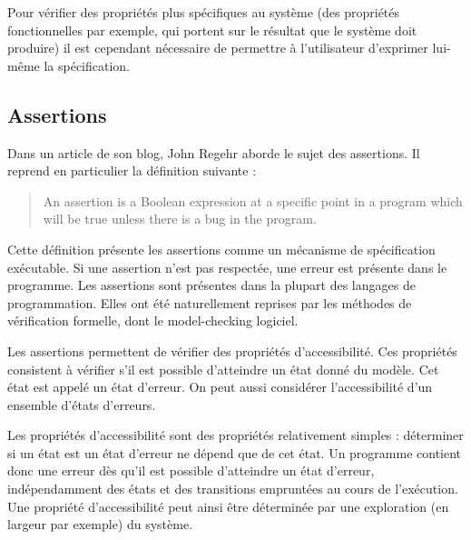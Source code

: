 Pour vérifier des propriétés plus spécifiques au système (des propriétés
fonctionnelles par exemple, qui portent sur le résultat que le système doit
produire) il est cependant nécessaire de permettre à l'utilisateur d'exprimer
lui-même la spécification.

\subsection{Assertions}

Dans un article de son blog, John Regehr aborde le sujet des
assertions\cite{assertion_regehr}.
Il reprend en particulier la définition suivante :

\begin{quotation}
An assertion is a Boolean expression at a specific point in a program which will
be true unless there is a bug in the program.
\hfill \cite{assertion_regehr}
\end{quotation}





Cette définition présente les assertions comme un mécanisme de spécification
exécutable. Si une assertion n'est pas respectée, une erreur est présente dans
le programme. Les assertions sont présentes dans la plupart des langages de
programmation. Elles ont été naturellement reprises par les méthodes de
vérification formelle, dont le model-checking logiciel.

Les assertions permettent de vérifier des propriétés d'accessibilité. Ces
propriétés consistent à vérifier s’il est possible d'atteindre un état donné du
modèle. Cet état est appelé un état d'erreur. On peut aussi considérer
l'accessibilité d'un ensemble d'états d'erreurs.

Les propriétés d'accessibilité sont des propriétés relativement simples :
déterminer si un état est un état d'erreur ne dépend que de cet état. Un
programme contient donc une erreur dès qu'il est possible d'atteindre un état
d'erreur, indépendamment des états et des transitions empruntées au cours de
l'exécution. Une propriété d'accessibilité peut ainsi être déterminée par une
exploration (en largeur par exemple) du système.

